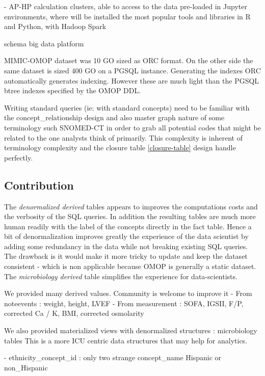 - AP-HP calculation clusters, able to access to the data pre-loaded in Jupyter environments, where will be installed the most popular tools and libraries in R and Python, with Hadoop Spark

schema big data platform

MIMIC-OMOP dataset was 10 GO sized as ORC format. On the other side the same
dataset is sized 400 GO on a PGSQL instance. Generating the indexes
ORC automatically generates indexing. However these are much light than the
PGSQL btree indexes specified by the OMOP DDL.

Writing standard queries (ie: with standard concepts) need to be familiar with
the concept\_relationship design and also master graph nature of some
terminology such SNOMED-CT in order to grab all potential codes that might be
related to the one analysts think of primarily. This complexity is inherent of
terminology complexity and the closure table \ref{closure-table} design handle
perfectly.

\subsection{Contribution}

The \emph{denormalized derived} tables appears to improves the computations
costs and the verbosity of the SQL queries. In addition the resulting tables
are much more human readily with the label of the concepts directly in the fact
table. Hence a bit of denormalization improves greatly the experience of the
data scientist by adding some redundancy in the data while not breaking
existing SQL queries. The drawback is it would make it more tricky to update
and keep the dataset consistent - which is non applicable because OMOP is
generally a static dataset.
The \emph{microbiology derived} table simplifies the experience for
data-scientists.

We provided many derived values. Community is welcome to improve it
- From noteevents : weight, height, LVEF
- From measurement : SOFA, IGSII, F/P, corrected Ca / K, BMI, corrected osmolarity

We also provided materialized views with denormalized structures : microbiology tables
This is a more ICU centric data structures that may help for analytics.


- ethnicity\_concept\_id : only two strange concept\_name Hispanic or non\_Hispanic
